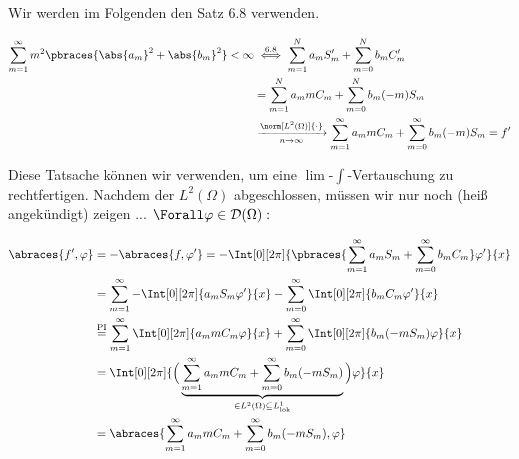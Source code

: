 \begin{solution}
\begin{enumerate}[label = (\roman*)]
\begin{enumerate}
\begin{itemize}
      Wir werden im Folgenden den Satz 6.8 verwenden.


      \begin{align*}
        \sum_{m=1}^\infty m^2 \pbraces{\abs{a_m}^2 + \abs{b_m}^2} < \infty
        & \stackrel
        {
          \mathrm{6.8}
        }{\iff}
        \sum_{m=1}^N a_m S_m^\prime + \sum_{m=0}^N b_m C_m^\prime \\
        & =
        \sum_{m=1}^N a_m m C_m + \sum_{m=0}^N b_m (-m) S_m \\
        & \xrightarrow[n \to \infty]{\norm[L^2(\Omega)]{\cdot}}
        \sum_{m=1}^\infty a_m m C_m + \sum_{m=0}^\infty b_m (-m) S_m
        =
        f^{\prime}
      \end{align*}

      Diese Tatsache können wir verwenden, um eine $\lim$-$\int$-Vertauschung zu rechtfertigen.
      Nachdem der $L^2(\Omega)$ abgeschlossen, müssen wir nur noch (heiß angekündigt) zeigen ... $\Forall \varphi \in \mathcal{D}(\Omega):$

      \begin{align*}
        \abraces{f^\prime, \varphi}
        & =
        - \abraces{f, \varphi^\prime}
        =
        - \Int[0][2 \pi]
        {
          \pbraces
          {
            \sum_{m=1}^\infty a_m S_m + \sum_{m=0}^\infty b_m C_m
          }
          \varphi^\prime
        }{x} \\
        & =
        \sum_{m=1}^\infty - \Int[0][2 \pi]{a_m S_m \varphi^\prime}{x}
        -
        \sum_{m=0}^\infty \Int[0][2 \pi]{b_m C_m \varphi^\prime}{x} \\
        & \stackrel
        {
          \mathrm{PI}
        }{=}
        \sum_{m=1}^\infty \Int[0][2 \pi]{a_m m C_m \varphi}{x}
        +
        \sum_{m=0}^\infty \Int[0][2 \pi]{b_m (-m S_m) \varphi}{x} \\
        & =
        \Int[0][2 \pi]
        {
          \Big (
            \underbrace
            {
              \sum_{m=1}^\infty a_m m C_m
              +
              \sum_{m=0}^\infty b_m (-m S_m)
            }_{
              \in L^2(\Omega) \subseteq L^1_\mathrm{lok}
            }
          \Big )
          \varphi
        }{x} \\
        & =
        \abraces
        {
          \sum_{m=1}^\infty a_m m C_m
          +
          \sum_{m=0}^\infty b_m (-m S_m),
          \varphi
        }
      \end{align*}


\end{itemize}
\end{enumerate}
\end{enumerate}
\end{solution}
